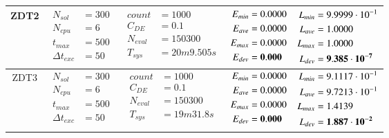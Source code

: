 \begin{table*} [!t]
\begin{tabular}[c]{ccccc}
ZDT2
&
{$\!\begin{aligned}
    N_{sol}        &= 300 \\
	N_{cpu}        &= 6 \\
	t_{max}        &= 500 \\
	\Delta t_{exc} &= 50
\end{aligned}$}
&
{$\!\begin{aligned}
	count    &= 1000 \\
	C_{DE}   &= 0.1 \\
	N_{eval} &= 150300 \\
	T_{sys}  &= 20m9.505s
\end{aligned}$}
&
{$\!\begin{aligned}
    E_{min} &= 0.0000 \\
    E_{ave} &= 0.0000 \\
    E_{max} &= 0.0000 \\
    E_{dev} &= {\bf 0.000}
\end{aligned}$}
&
{$\!\begin{aligned}
    L_{min} &= 9.9999\cdot 10^{-1} \\
    L_{ave} &= 1.0000 \\
    L_{max} &= 1.0000 \\
    L_{dev} &= {\bf 9.385\cdot 10^{-7}}
\end{aligned}$} \\

\hline



ZDT3
&
{$\!\begin{aligned}
    N_{sol}        &= 300 \\
	N_{cpu}        &= 6 \\
	t_{max}        &= 500 \\
	\Delta t_{exc} &= 50
\end{aligned}$}
&
{$\!\begin{aligned}
	count    &= 1000 \\
	C_{DE}   &= 0.1 \\
	N_{eval} &= 150300 \\
	T_{sys}  &= 19m31.8s
\end{aligned}$}
&
{$\!\begin{aligned}
    E_{min} &= 0.0000 \\
    E_{ave} &= 0.0000 \\
    E_{max} &= 0.0000 \\
    E_{dev} &= {\bf 0.000}
\end{aligned}$}
&
{$\!\begin{aligned}
    L_{min} &= 9.1117\cdot 10^{-1} \\
    L_{ave} &= 9.7213\cdot 10^{-1} \\
    L_{max} &= 1.4139 \\
    L_{dev} &= {\bf 1.887\cdot 10^{-2}}
\end{aligned}$} \\


\end{tabular}
\end{table*}
